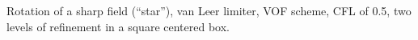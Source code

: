 Rotation of a sharp field (``star''), van Leer limiter, VOF scheme, CFL of 0.5, two levels of refinement in a square centered box.
